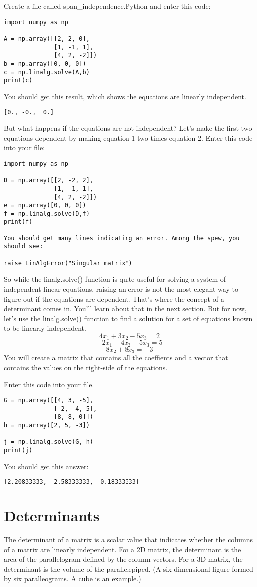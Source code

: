 Create a file called span\_independence.Python and enter this code:
\begin{Verbatim}
import numpy as np

A = np.array([[2, 2, 0], 
              [1, -1, 1],
              [4, 2, -2]])
b = np.array([0, 0, 0])
c = np.linalg.solve(A,b)
print(c)
\end{Verbatim}
You should get this result, which shows the equations are linearly independent.
\begin{Verbatim}
[0., -0.,  0.]
\end{Verbatim}
But what happens if the equations are not independent? Let's make the first two equations dependent by making equation 1 two times equation 2. Enter this code into your file:
\begin{Verbatim}
import numpy as np

D = np.array([[2, -2, 2], 
              [1, -1, 1],
              [4, 2, -2]])
e = np.array([0, 0, 0])
f = np.linalg.solve(D,f)
print(f)

You should get many lines indicating an error. Among the spew, you should see:

raise LinAlgError("Singular matrix")
\end{Verbatim}
So while the linalg.solve() function is quite useful for solving a system of independent linear equations, raising an error is not the most elegant way to figure out if the equations are dependent. That's where the concept of a determinant comes in. You'll learn about that in the next section. But for now, let's use the  linalg.solve() function to find a solution for a set of equations known to be linearly independent.
$$4x_1 + 3x_2 - 5x_3 = 2$$
$$-2x_1- 4x_2 - 5x_3 = 5$$
$$       8x_2 + 8x_3  = -3$$
You will create a matrix that contains all the coeffients and a vector that contains the values on the right-side of the equations. 

Enter this code into your file. 
\begin{Verbatim}
G = np.array([[4, 3, -5], 
              [-2, -4, 5], 
              [8, 8, 0]])
h = np.array([2, 5, -3])

j = np.linalg.solve(G, h)
print(j)
\end{Verbatim}
You should get this answer:
\begin{Verbatim}
[2.20833333, -2.58333333, -0.18333333]
\end{Verbatim}

\section{Determinants}
The determinant of a matrix is a scalar value that indicates whether the columns of a matrix are linearly independent. For a 2D matrix, the determinant is the area of the parallelogram defined by the column vectors. For a 3D matrix, the determinant is the volume of the parallelepiped. (A six-dimensional figure formed by six paralleograms. A cube is an example.) 

